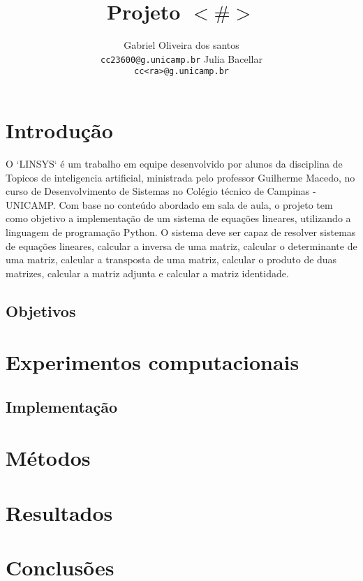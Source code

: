 \documentclass[11pt]{article}
\title{Projeto $<\#>$}
\author{Gabriel Oliveira dos santos \\ \texttt{cc23600@g.unicamp.br} \And Julia Bacellar \\ \texttt{cc<ra>@g.unicamp.br}}
\theoremstyle{definition} \newtheorem{definition}{Definição}
\theoremstyle{definition} \newtheorem{example}{Exemplo}
\begin{document}
\maketitle

\section{Introdução}

{O `LINSYS` é um trabalho em equipe desenvolvido por alunos da disciplina de Topicos de inteligencia artificial, ministrada pelo professor Guilherme Macedo, no curso de Desenvolvimento de Sistemas no Colégio técnico de Campinas - UNICAMP. Com base no conteúdo abordado em sala de aula, o projeto tem como objetivo a implementação de um sistema de equações lineares, utilizando a linguagem de programação Python. O sistema deve ser capaz de resolver sistemas de equações lineares, calcular a inversa de uma matriz, calcular o determinante de uma matriz, calcular a transposta de uma matriz, calcular o produto de duas matrizes, calcular a matriz adjunta e calcular a matriz identidade.}

\subsection{Objetivos}

\section{Experimentos computacionais}

\subsection{Implementação}

\section{Métodos}

\section{Resultados}

\section{Conclusões}
\end{document}

